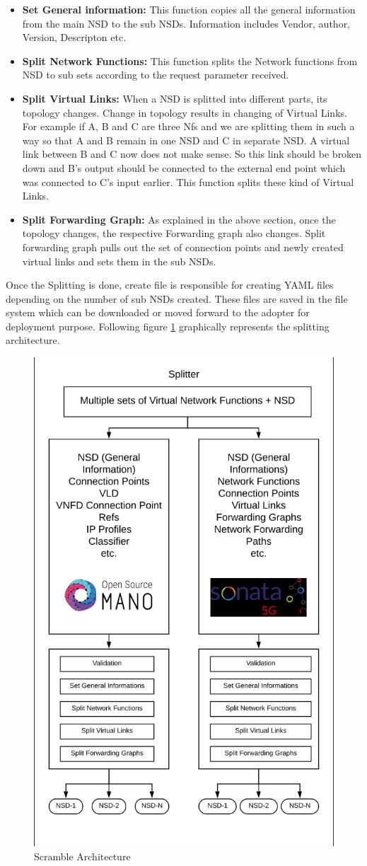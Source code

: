 \begin{itemize}
	\item \textbf{Set General information: }This function copies all the general information from the main NSD to the sub NSDs. Information includes Vendor, author, Version, Descripton etc.
	\item \textbf{Split Network Functions: }This function splits the Network functions from NSD to sub sets according to the request parameter received. 
	\item \textbf{Split Virtual Links: }When a NSD is splitted into different parts, its topology changes. Change in topology results in changing of Virtual Links. For example if A, B and C are three Nfs and we are splitting them in such a way so that A and B remain in one NSD and C in separate NSD. A virtual link between B and C now does not make sense. So this link should be broken down and B’s output should be connected to the external end point which was connected to C’s input earlier. This function splits these kind of Virtual Links.
	\item \textbf{Split Forwarding Graph: }As explained in the above section, once the topology changes, the respective Forwarding graph also changes. Split forwarding graph pulls out the set of connection points and newly created virtual links and sets them in the sub NSDs.
\end{itemize} 

Once the Splitting is done, create file is responsible for creating YAML files depending on the number of sub NSDs created. These files are saved in the file system which can be downloaded or moved forward to the adopter for deployment purpose. Following figure \ref{fig:splitter} graphically represents the splitting architecture.

\begin{figure} [h]
	\centering
	\includegraphics[width=0.5\linewidth]{figures/splitter}
	\caption{Scramble Architecture}
	\label{fig:splitter}
\end{figure}
